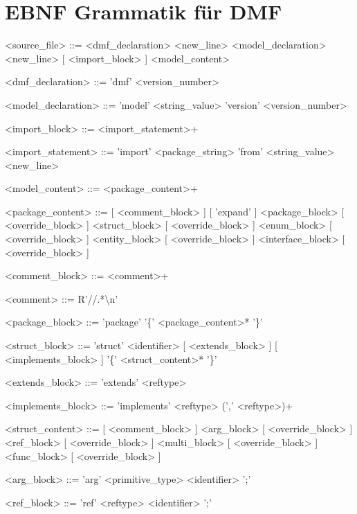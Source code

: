 \documentclass[./einleitung.tex]{subfiles}
\begin{document}
\section{EBNF Grammatik für DMF}
\setlength{\grammarparsep}{20pt plus 1pt minus 1pt} %
\setlength{\grammarindent}{12em} %

\begin{grammar}
<source_file> ::= <dmf_declaration> <new_line> <model_declaration> <new_line> [ <import_block> ] <model_content>

<dmf_declaration> ::= 'dmf' <version_number>


<model_declaration> ::= 'model' <string_value> 'version' <version_number>

<import_block> ::= <import_statement>+

<import_statement> ::= 'import' <package_string> 'from' <string_value> <new_line>



<model_content> ::= <package_content>+

<package_content> ::= [ <comment_block> ] [ 'expand' ] <package_block> [ <override_block> ]
 <struct_block> [ <override_block> ]
 <enum_block> [ <override_block> ]
 <entity_block> [ <override_block> ]
 <interface_block> [ <override_block> ]

<comment_block> ::= <comment>+

<comment> ::= R'//.*\textbackslash n'

<package_block> ::= 'package' '\{' <package_content>* '\}'

<struct_block> ::= 'struct' <identifier> [ <extends_block> ] [ <implements_block> ] '\{' <struct_content>* '\}'


<extends_block> ::= 'extends' <reftype>

<implements_block> ::= 'implements' <reftype> (',' <reftype>)+

<struct_content> ::= [ <comment_block> ] <arg_block> [ <override_block> ]
 <ref_block> [ <override_block> ]
 <multi_block> [ <override_block> ]
 <func_block> [ <override_block> ]

<arg_block> ::= 'arg' <primitive_type> <identifier> ';'

<ref_block> ::= 'ref' <reftype> <identifier> ';'


\end{grammar}
\end{document}
